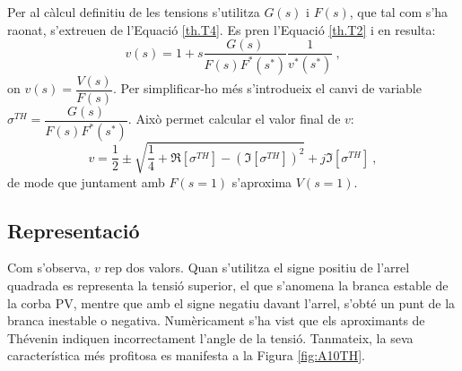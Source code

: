 Per al càlcul definitiu de les tensions s'utilitza $G(s)$ i $F(s)$, que tal com s'ha raonat, s'extreuen de l'Equació \ref{th.T4}. Es pren l'Equació \ref{th.T2} i en resulta:
\begin{equation}
    v(s)=1+s\frac{G(s)}{F(s)F^*(s^*)}\frac{1}{v^*(s^*)}\ ,
    \label{th.T22}
\end{equation}
on $v(s)=\dfrac{V(s)}{F(s)}$. Per simplificar-ho més s'introdueix el canvi de variable $\sigma^{TH}=\dfrac{G(s)}{F(s)F^*(s^*)}$. Això permet calcular el valor final de $v$:
\begin{equation}
    v=\frac{1}{2}\pm \sqrt{\frac{1}{4}+\Re[\sigma^{TH}]-(\Im[\sigma^{TH}])^2}+j\Im[\sigma^{TH}]\ ,
    \label{th.T23}
\end{equation}
de mode que juntament amb $F(s=1)$ s'aproxima $V(s=1)$.
\subsection{Representació}
Com s'observa, $v$ rep dos valors. Quan s'utilitza el signe positiu de l'arrel quadrada es representa la tensió superior, el que s'anomena la branca estable de la corba PV, mentre que amb el signe negatiu davant l'arrel, s'obté un punt de la branca inestable o negativa. Numèricament s'ha vist que els aproximants de Thévenin indiquen incorrectament l'angle de la tensió. Tanmateix, la seva característica més profitosa es manifesta a la Figura \ref{fig:A10TH}.

